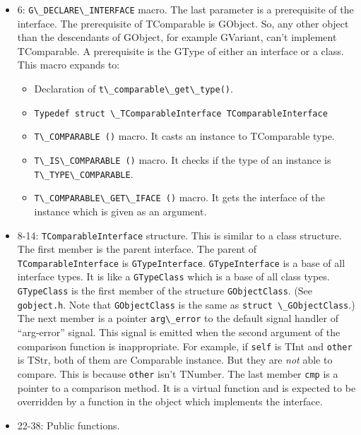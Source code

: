 \begin{itemize}
\tightlist
\item
  6: \passthrough{\lstinline!G\_DECLARE\_INTERFACE!} macro. The last
  parameter is a prerequisite of the interface. The prerequisite of
  TComparable is GObject. So, any other object than the descendants of
  GObject, for example GVariant, can't implement TComparable. A
  prerequisite is the GType of either an interface or a class. This
  macro expands to:

  \begin{itemize}
  \tightlist
  \item
    Declaration of \passthrough{\lstinline!t\_comparable\_get\_type()!}.
  \item
    \passthrough{\lstinline!Typedef struct \_TComparableInterface TComparableInterface!}
  \item
    \passthrough{\lstinline!T\_COMPARABLE ()!} macro. It casts an
    instance to TComparable type.
  \item
    \passthrough{\lstinline!T\_IS\_COMPARABLE ()!} macro. It checks if
    the type of an instance is
    \passthrough{\lstinline!T\_TYPE\_COMPARABLE!}.
  \item
    \passthrough{\lstinline!T\_COMPARABLE\_GET\_IFACE ()!} macro. It
    gets the interface of the instance which is given as an argument.
  \end{itemize}
\item
  8-14: \passthrough{\lstinline!TComparableInterface!} structure. This
  is similar to a class structure. The first member is the parent
  interface. The parent of
  \passthrough{\lstinline!TComparableInterface!} is
  \passthrough{\lstinline!GTypeInterface!}.
  \passthrough{\lstinline!GTypeInterface!} is a base of all interface
  types. It is like a \passthrough{\lstinline!GTypeClass!} which is a
  base of all class types. \passthrough{\lstinline!GTypeClass!} is the
  first member of the structure \passthrough{\lstinline!GObjectClass!}.
  (See \passthrough{\lstinline!gobject.h!}. Note that
  \passthrough{\lstinline!GObjectClass!} is the same as
  \passthrough{\lstinline!struct \_GObjectClass!}.) The next member is a
  pointer \passthrough{\lstinline!arg\_error!} to the default signal
  handler of ``arg-error'' signal. This signal is emitted when the
  second argument of the comparison function is inappropriate. For
  example, if \passthrough{\lstinline!self!} is TInt and
  \passthrough{\lstinline!other!} is TStr, both of them are Comparable
  instance. But they are \emph{not} able to compare. This is because
  \passthrough{\lstinline!other!} isn't TNumber. The last member
  \passthrough{\lstinline!cmp!} is a pointer to a comparison method. It
  is a virtual function and is expected to be overridden by a function
  in the object which implements the interface.
\item
  22-38: Public functions.
\end{itemize}

